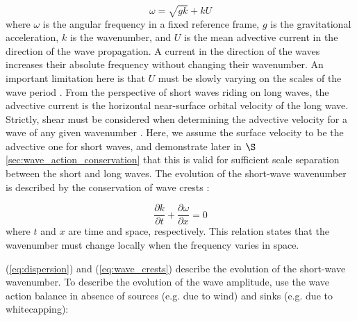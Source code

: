 \documentclass[lineno]{jfm}
\begin{document}
\begin{equation}
\label{eq:dispersion}
\omega = \sqrt{gk} + k U
\end{equation}
where $\omega$ is the angular frequency in a fixed reference frame, $g$ is the
gravitational acceleration, $k$ is the wavenumber, and $U$ is the mean advective
current in the direction of the wave propagation.
A current in the direction of the waves increases their absolute frequency
without changing their wavenumber.
An important limitation here is that $U$ must be slowly varying on the scales of
the wave period \citep{bretherton1968wavetrains}.
From the perspective of short waves riding on long waves, the advective current
is the horizontal near-surface orbital velocity of the long wave.
Strictly, shear must be considered when determining the advective velocity for
a wave of any given wavenumber \citep{stewart1974hf,ellingsen2014ship}.
Here, we assume the surface velocity to be the advective one for short waves,
and demonstrate later in $\S$\ref{sec:wave_action_conservation} that this is
valid for sufficient scale separation between the short and long waves.
The evolution of the short-wave wavenumber is described by the conservation of
wave crests \citep[e.g.,][]{whitham1974dispersive,phillips1981dispersion}:

\begin{equation}
\label{eq:wave_crests}
\dfrac{\partial k}{\partial t}
+ \dfrac{\partial \omega}{\partial x}
= 0
\end{equation}
where $t$ and $x$ are time and space, respectively.
This relation states that the wavenumber must change locally when the frequency
varies in space.

(\ref{eq:dispersion}) and (\ref{eq:wave_crests}) describe the evolution of
the short-wave wavenumber.
To describe the evolution of the wave amplitude, use the wave action balance
\citep{bretherton1968wavetrains} in absence of sources (e.g. due to wind) and
sinks (e.g. due to whitecapping):
\end{document}
